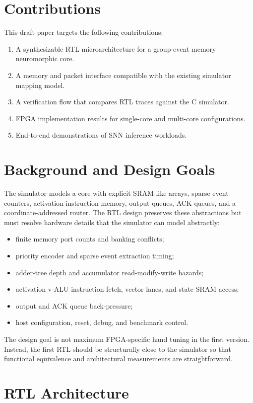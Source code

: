 \documentclass[10pt,conference]{IEEEtran}
\begin{document}
\section{Contributions}
This draft paper targets the following contributions:
\begin{enumerate}
    \item A synthesizable RTL microarchitecture for a group-event memory neuromorphic core.
    \item A memory and packet interface compatible with the existing simulator mapping model.
    \item A verification flow that compares RTL traces against the C simulator.
    \item FPGA implementation results for single-core and multi-core configurations.
    \item End-to-end demonstrations of SNN inference workloads.
\end{enumerate}

\section{Background and Design Goals}
The simulator models a core with explicit SRAM-like arrays, sparse event counters, activation instruction memory, output queues, ACK queues, and a coordinate-addressed router. The RTL design preserves these abstractions but must resolve hardware details that the simulator can model abstractly:
\begin{itemize}
    \item finite memory port counts and banking conflicts;
    \item priority encoder and sparse event extraction timing;
    \item adder-tree depth and accumulator read-modify-write hazards;
    \item activation v-ALU instruction fetch, vector lanes, and state SRAM access;
    \item output and ACK queue back-pressure;
    \item host configuration, reset, debug, and benchmark control.
\end{itemize}
The design goal is not maximum FPGA-specific hand tuning in the first version. Instead, the first RTL should be structurally close to the simulator so that functional equivalence and architectural measurements are straightforward.

\section{RTL Architecture}
\end{document}
